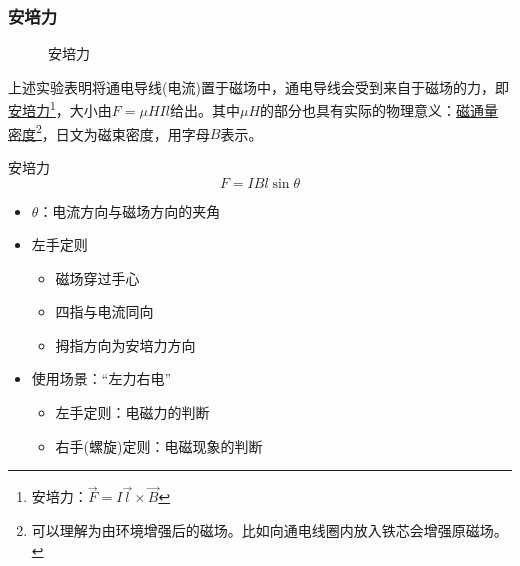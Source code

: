 \subsubsection{安培力}

\begin{figure}[ht!]
    \centering
    \caption{安培力}
\end{figure}
上述实验表明将通电导线(电流)置于磁场中，通电导线会受到来自于磁场的力，即\underline{安培力}\footnote{安培力：$\vec{F}=I\vec{l}\times\vec{B}$}，大小由$F=\mu HIl$给出。其中$\mu H$的部分也具有实际的物理意义：\underline{磁通量密度}\footnote{可以理解为由环境增强后的磁场。比如向通电线圈内放入铁芯会增强原磁场。}，日文为磁束密度，用字母$B$表示。
\begin{itembox}[l]{安培力}
    \begin{equation*}
        F=IBl\sin\theta
    \end{equation*}
    \begin{itemize}
        \item $\theta$：电流方向与磁场方向的夹角
        \item 左手定则
        \begin{itemize}
            \item 磁场穿过手心
            \item 四指与电流同向
            \item 拇指方向为安培力方向
        \end{itemize}
        \item 使用场景：“左力右电”
        \begin{itemize}
            \item 左手定则：电磁力的判断
            \item 右手(螺旋)定则：电磁现象的判断
        \end{itemize}
    \end{itemize}
\end{itembox}

